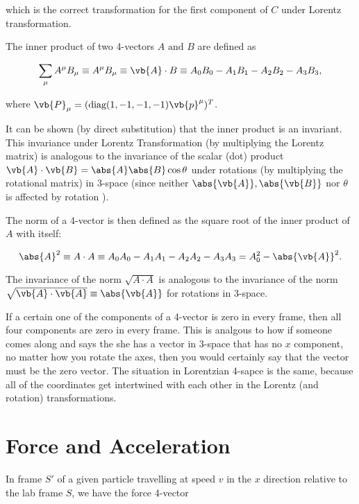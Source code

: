 \documentclass[english,a4paper,12pt]{report}
\begin{document}
which is the correct transformation for the first component of \(C\) under Lorentz transformation.

The inner product of two 4-vectors \(A \text { and } B\) are defined as 

\begin{equation}
    \sum_{\mu} A ^{\mu }B _{\mu } \equiv A ^{\mu } B _{\mu}  \equiv  \vb{A}  \cdot B  \equiv A_0 B_0 - A_1 B_1  - A_2 B_2 - A_3 B_3,
\end{equation}

where \(\vb{P} _{\mu } = (\text{diag}(1,-1,-1,-1) \vb{p} ^{\mu }  )^T \).  

It can be shown (by direct substitution) that the inner product is an invariant. This invariance under Lorentz Transformation (by multiplying the Lorentz matrix) is analogous to the invariance of the scalar (dot) product \(\vb{A} \cdot \vb{B} = \abs{A}\abs{B}\cos \theta   \) under rotations (by multiplying the rotational matrix) in 3-space (since neither \(\abs{\vb{A} }, \abs{\vb{B} }   \) nor \(\theta \) is affected by rotation ). 

The norm of a 4-vector is then defined as the square root of the inner product of \(A\) with itself:

\begin{equation}
    \abs{A}^2 \equiv A \cdot A \equiv A_0 A_0 - A_1 A_1 -A_2 A_2 -A_3 A_3  = A_0 ^2 - \abs{\vb{A} }^2.  
\end{equation}

The invariance of the norm \(\sqrt{A \cdot A} \) is analogous to the invariance of the norm \(\sqrt{\vb{A} \cdot \vb{A} } \equiv \abs{\vb{A} } \) for rotations in 3-space. 

If a certain one of the components of a 4-vector is zero in every frame, then all four components are zero in every frame. This is analgous to how if someone comes along and says the she has a vector in 3-space that has no \(x\) component, no matter how you rotate the axes, then you would certainly say that the vector must be the zero vector. The situation in Lorentzian 4-sapce is the same, because all of the coordinates get intertwined with each other in the Lorentz (and rotation) transformations.
\section{Force and Acceleration}

In frame \(S'\) of a given particle travelling at speed \(v\) in the \(x\) direction relative to the lab frame \(S\), we have the force 4-vector
\end{document}
